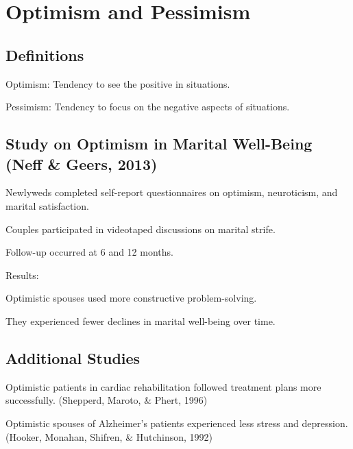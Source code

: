 \section{Optimism and Pessimism}  
\subsection{Definitions}  
\begin{coloredlist}  
    \item Optimism: Tendency to see the positive in situations.  
    \item Pessimism: Tendency to focus on the negative aspects of situations.  
\end{coloredlist}  

\subsection{Study on Optimism in Marital Well-Being (Neff \& Geers, 2013)}  
\begin{coloredlist}  
    \item Newlyweds completed self-report questionnaires on optimism, neuroticism, and marital satisfaction.  
    \item Couples participated in videotaped discussions on marital strife.  
    \item Follow-up occurred at 6 and 12 months.  
    \item Results:  
    \begin{coloredlist}  
        \item Optimistic spouses used more constructive problem-solving.  
        \item They experienced fewer declines in marital well-being over time.  
    \end{coloredlist}  
\end{coloredlist}  

\subsection{Additional Studies}  
\begin{coloredlist}  
    \item Optimistic patients in cardiac rehabilitation followed treatment plans more successfully. (Shepperd, Maroto, \& Phert, 1996)  
    \item Optimistic spouses of Alzheimer's patients experienced less stress and depression. (Hooker, Monahan, Shifren, \& Hutchinson, 1992)  
\end{coloredlist}  

